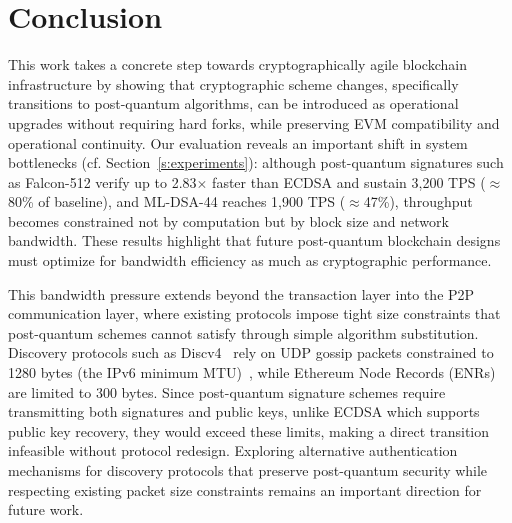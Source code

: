 \section{Conclusion}\label{sec:conclusion}



This work takes a concrete step towards cryptographically agile blockchain infrastructure by showing that cryptographic scheme changes, specifically transitions to post-quantum algorithms, can be introduced as operational upgrades without requiring hard forks, while preserving EVM compatibility and operational continuity. 
Our evaluation reveals an important shift in system bottlenecks (cf. Section~\ref{s:experiments}): although post-quantum signatures such as Falcon-512 verify up to 2.83$\times$ faster than ECDSA and sustain 3{,}200 TPS ($\approx$80\% of baseline), and ML-DSA-44 reaches 1{,}900 TPS ($\approx$47\%), throughput becomes constrained not by computation but by block size and network bandwidth. 
These results highlight that future post-quantum blockchain designs must optimize for bandwidth efficiency as much as cryptographic performance.

This bandwidth pressure extends beyond the transaction layer into the P2P communication layer, where existing protocols impose tight size constraints that post-quantum schemes cannot satisfy through simple algorithm substitution.
Discovery protocols such as Discv4~\cite{ethereum_discv4} rely on UDP gossip packets constrained to 1280 bytes (the IPv6 minimum MTU)~\cite{rfc8200_ipv6_min_mtu}, while Ethereum Node Records (ENRs)~\cite{eip868} are limited to 300 bytes.
Since post-quantum signature schemes require transmitting both signatures and public keys, unlike ECDSA which supports public key recovery, they would exceed these limits, making a direct transition infeasible without protocol redesign.
Exploring alternative authentication mechanisms for discovery protocols that preserve post-quantum security while respecting existing packet size constraints remains an important direction for future work.

